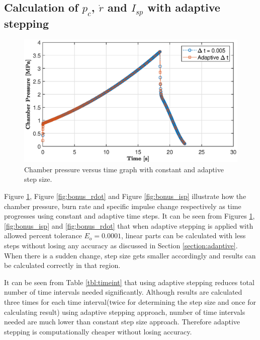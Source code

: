 \documentclass[letterpaper,12pt]{article}
\begin{document}
\newpage
\subsection{Calculation of $p_c$, $\dot{r}$ and $I_{sp}$ with adaptive stepping}

\begin{figure}[!h]
	\centering
	\includegraphics[height = 8.5 cm]{graphs/bonus_pc.eps}
	\caption{Chamber pressure versus time graph with constant and adaptive step size.}
	\label{fig:bonus_cp}
\end{figure}

Figure \ref{fig:bonus_cp}, Figure \ref{fig:bonus_rdot} and Figure \ref{fig:bonus_isp} illustrate how the chamber pressure, 
burn rate and specific impulse change respectively as time progresses using constant and adaptive time steps.
It can be seen from Figures \ref{fig:bonus_cp}, \ref{fig:bonus_isp} and \ref{fig:bonus_rdot} that when adaptive stepping is 
applied with allowed percent tolerance $E_o = 0.0001$, linear parts can be calculated with less steps without losing any accuracy as discussed in 
Section \ref{section:adaptive}. When there is a sudden change, step size gets smaller accordingly and results can be calculated correctly in that region.

It can be seen from Table \ref{tbl:timeint} that using adaptive stepping reduces total number of time intervals needed significantly.
Although results are calculated three times for each time interval(twice for determining the step size and once for calculating result) 
using adaptive stepping approach, number of time intervals needed are much lower than constant step size approach. Therefore adaptive stepping is 
computationally cheaper without losing accuracy. 
\end{document}
